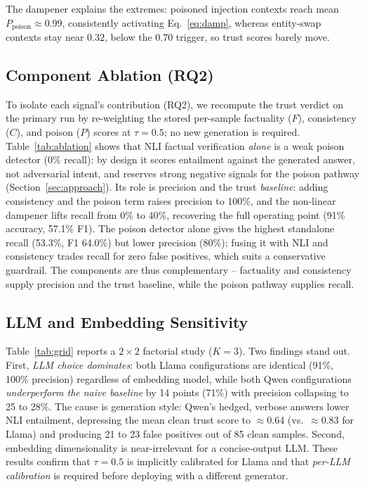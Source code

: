 
The dampener explains the extremes: poisoned injection contexts reach mean $P_{\text{poison}}\approx0.99$, consistently activating Eq.~\ref{eq:damp}, whereas entity-swap contexts stay near $0.32$, below the $0.70$ trigger, so trust scores barely move.


\subsection{Component Ablation (RQ2)}
\label{sec:ablation}

To isolate each signal's contribution (RQ2), we recompute the trust verdict on the primary run by re-weighting the stored per-sample factuality ($F$), consistency ($C$), and poison ($P$) scores at $\tau{=}0.5$; no new generation is required. Table~\ref{tab:ablation} shows that NLI factual verification \emph{alone} is a weak poison detector (0\% recall): by design it scores entailment against the generated answer, not adversarial intent, and reserves strong negative signals for the poison pathway (Section~\ref{sec:approach}). Its role is precision and the trust \emph{baseline}: adding consistency and the poison term raises precision to 100\%, and the non-linear dampener lifts recall from 0\% to 40\%, recovering the full operating point (91\% accuracy, 57.1\% F1). The poison detector alone gives the highest standalone recall (53.3\%, F1 64.0\%) but lower precision (80\%); fusing it with NLI and consistency trades recall for zero false positives, which suits a conservative guardrail. The components are thus complementary -- factuality and consistency supply precision and the trust baseline, while the poison pathway supplies recall.

\subsection{LLM and Embedding Sensitivity}
\label{sec:grid}
Table~\ref{tab:grid} reports a $2\times2$ factorial study ($K{=}3$). Two findings stand out. First, \emph{LLM choice dominates}: both Llama configurations are identical (91\%, 100\% precision) regardless of embedding model, while both Qwen configurations \emph{underperform the naive baseline} by 14 points (71\%) with precision collapsing to 25 to 28\%. The cause is generation style: Qwen's hedged, verbose answers lower NLI entailment, depressing the mean clean trust score to $\approx$0.64 (vs.\ $\approx$0.83 for Llama) and producing 21 to 23 false positives out of 85 clean samples. Second, embedding dimensionality is near-irrelevant for a concise-output LLM. These results confirm that $\tau{=}0.5$ is implicitly calibrated for Llama and that \emph{per-LLM calibration} is required before deploying with a different generator.

